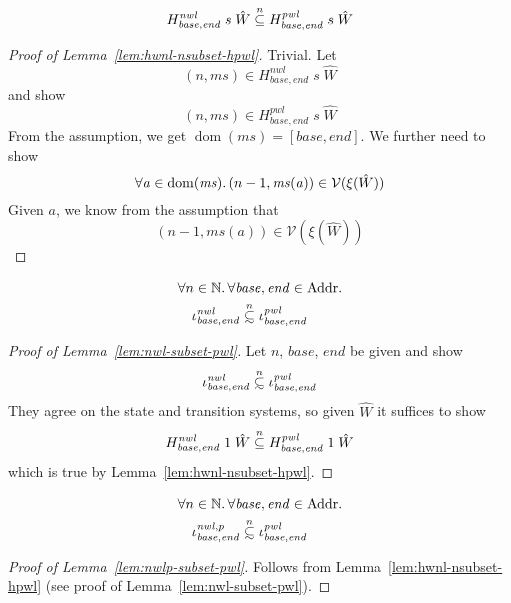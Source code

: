 \documentclass[a4paper]{article}
\newcommand\subsetsim{\mathrel{\ooalign{\raise.2ex\hbox{$\subset$}\cr
      \hidewidth\lower.8ex\hbox{\scalebox{0.9}{$\sim$}}\hidewidth\cr}}}
\newcommand{\nsubsim}[1][n]{\stackrel{\tiny{#1}}{\subsetsim}}
\newcommand{\nsubeq}[1][n]{\stackrel{\tiny{#1}}{\subseteq}}
\DeclareMathOperator{\dom}{dom}
\newcommand{\var}[1]{\mathit{#1}}
\newcommand{\hs}{\var{ms}}
\newcommand{\ms}{\hs}
\newcommand{\addr}{\var{a}}
\newcommand{\start}{\var{base}}
\newcommand{\addrend}{\var{end}}
\newcommand{\nwl}{\var{nwl}}
\newcommand{\pwl}{\var{pwl}}
\newcommand{\asmType}{\plaindom{AsmType}}
\newcommand{\plaindom}[1]{\mathrm{#1}}
\newcommand{\Addrs}{\plaindom{Addr}}
\newcommand{\nats}{\mathbb{N}}
\newcommand{\intr}[2]{\mathcal{#1}}
\newcommand{\valueintr}[1]{\intr{V}{#1}}
\newcommand{\stdvr}{\valueintr{\asmType}}
\newcommand{\npair}[2][n]{\left(#1,#2 \right)}
\begin{document}
\begin{lemma}
  \label{lem:hwnl-nsubset-hpwl}
  \[
    H^\nwl_{\start,\addrend} \; s\; \hat{W} \nsubeq H^\pwl_{\start,\addrend} \; s\; \hat{W}
  \]
\end{lemma}
\begin{proof}[Proof of Lemma~\ref{lem:hwnl-nsubset-hpwl}]
  Trivial. Let
  \[
    \npair{\ms} \in H^\nwl_{\start,\addrend} \; s\; \hat{W}
  \]
  and show
  \[
    \npair{\ms} \in H^\pwl_{\start,\addrend} \; s\; \hat{W}
  \]
  From the assumption, we get $\dom(\ms) = [\start,\addrend]$. We further need to show
  \[
    \forall \addr \in \dom(\ms) \ldotp \npair[n-1]{\ms(\addr)} \in \stdvr(\xi(\hat{W}))
  \]
  Given $\addr$, we know from the assumption that
  \[
    \npair[n-1]{\ms(\addr)} \in \stdvr(\xi(\hat{W}))
  \]
\end{proof}

\begin{lemma}
  \label{lem:nwl-subset-pwl}
  \begin{align*}
    & \forall n \in \nats\ldotp \forall \start, \addrend \in \Addrs \ldotp  \\
    & \quad \iota^\nwl_{\start,\addrend} \nsubsim \iota^\pwl_{\start,\addrend}
  \end{align*}
\end{lemma}
\begin{proof}[Proof of Lemma~\ref{lem:nwl-subset-pwl}]
  Let $n$, $\start$, $\addrend$ be given and show
  \[
    \iota^\nwl_{\start,\addrend} \nsubsim \iota^\pwl_{\start,\addrend}
  \]
  They agree on the state and transition systems, so given $\hat{W}$ it suffices to show
  \[
    H^\nwl_{\start,\addrend} \; 1\; \hat{W} \nsubeq H^\pwl_{\start,\addrend} \; 1\; \hat{W}  
  \]
  which is true by Lemma~\ref{lem:hwnl-nsubset-hpwl}.
\end{proof}

\begin{lemma}
  \label{lem:nwlp-subset-pwl}
  \begin{align*}
    & \forall n \in \nats\ldotp \forall \start, \addrend \in \Addrs \ldotp  \\
    & \quad \iota^{\nwl,p}_{\start,\addrend}  \nsubsim \iota^\pwl_{\start,\addrend}
  \end{align*}
\end{lemma}
\begin{proof}[Proof of Lemma~\ref{lem:nwlp-subset-pwl}]
  Follows from Lemma~\ref{lem:hwnl-nsubset-hpwl} (see proof of Lemma~\ref{lem:nwl-subset-pwl}).
\end{proof}
\end{document}

